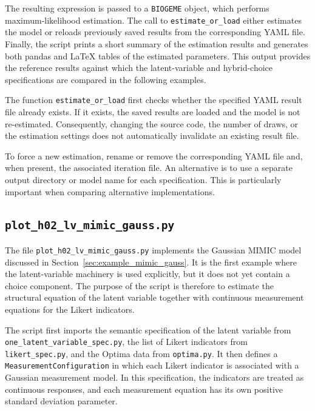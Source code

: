 \documentclass[12pt,a4paper]{article}
\begin{document}
The resulting expression is passed to a \lstinline$BIOGEME$ object,
which performs maximum-likelihood estimation. The call to
\lstinline$estimate_or_load$ either estimates the model or reloads
previously saved results from the corresponding YAML file. Finally,
the script prints a short summary of the estimation results and
generates both pandas and \LaTeX{} tables of the estimated parameters.
This output provides the reference results against which the
latent-variable and hybrid-choice specifications are compared in the
following examples.

The function \lstinline$estimate_or_load$ first checks whether the
specified YAML result file already exists. If it exists, the saved
results are loaded and the model is not re-estimated. Consequently,
changing the source code, the number of draws, or the estimation
settings does not automatically invalidate an existing result file.

To force a new estimation, rename or remove the corresponding YAML file
and, when present, the associated iteration file. An alternative is to
use a separate output directory or model name for each specification.
This is particularly important when comparing alternative
implementations.

\subsection{\lstinline$plot_h02_lv_mimic_gauss.py$}
\label{sec:plot_h02_lv_mimic_gauss.py}


The file \lstinline$plot_h02_lv_mimic_gauss.py$ implements the
Gaussian MIMIC model discussed in
Section~\ref{sec:example_mimic_gauss}. It is the first example where
the latent-variable machinery is used explicitly, but it does not yet
contain a choice component. The purpose of the script is therefore to
estimate the structural equation of the latent variable together with
continuous measurement equations for the Likert indicators.

The script first imports the semantic specification of the latent
variable from \lstinline$one_latent_variable_spec.py$, the list of
Likert indicators from \lstinline$likert_spec.py$, and the Optima data
from \lstinline$optima.py$. It then defines a
\lstinline$MeasurementConfiguration$ in which each Likert indicator is
associated with a Gaussian measurement model. In this specification,
the indicators are treated as continuous responses, and each
measurement equation has its own positive standard deviation
parameter.
\end{document}
